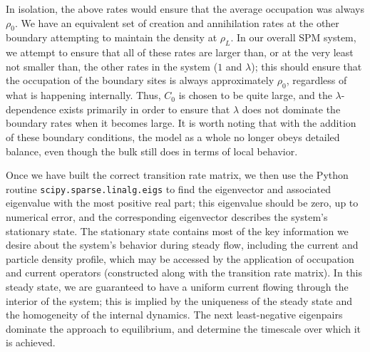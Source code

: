 \documentclass[
reprint, amsmath,amssymb, aps,
 pre, longbibliography,
]{revtex4-1}
\begin{document}
In isolation, the above rates would ensure that the average occupation was always $\rho_0$. We have an equivalent set of creation and annihilation rates at the other boundary attempting to maintain the density at $\rho_L$. In our overall SPM system, we attempt to ensure that all of these rates are larger than, or at the very least not smaller than,
the other rates in the system ($1$ and $\lambda$); this should ensure that the occupation of the boundary sites is always approximately $\rho_0$, regardless of what is happening internally.
Thus, $C_0$ is chosen to be quite large, and the $\lambda$-dependence exists primarily in order to ensure that $\lambda$ does not dominate the boundary rates when it becomes large.
It is worth noting that with the addition of these boundary conditions, the model as a whole no longer obeys detailed balance, even though the bulk still does in terms of
local behavior.

Once we have built the correct transition rate matrix, we then use the
Python routine \texttt{scipy.sparse.linalg.eigs} to find the
eigenvector and associated eigenvalue with the most positive real
part; this eigenvalue
should be zero, up to numerical error, and the corresponding
eigenvector describes the system's
stationary state.  The stationary state contains most of the key
information we desire about the system's behavior during steady flow,
including the current and particle density profile, which may be
accessed by the application of occupation and current operators
(constructed along with the transition rate matrix). In this steady
state, we are guaranteed to have a uniform current flowing through the
interior of the system; this is implied by the uniqueness of the
steady state and the homogeneity of the internal dynamics.  The next
least-negative eigenpairs dominate the approach to equilibrium, and
determine the timescale over which it is achieved.
\end{document}
